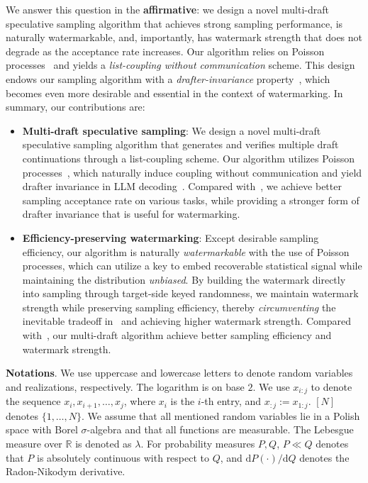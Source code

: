 \documentclass{article}
\theoremstyle{plain}
\theoremstyle{definition}
\begin{document}
We answer this question in the \textbf{affirmative}: we design a novel multi-draft speculative sampling algorithm that achieves strong sampling performance, is naturally watermarkable, and, importantly, has watermark strength that does not degrade as the acceptance rate increases. 
Our algorithm relies on Poisson processes~\citep{li2021unified, maddison2016poisson} and yields a \emph{list-coupling without communication} scheme. This design %
endows our sampling algorithm with a \emph{drafter-invariance} property~\citep{daliri2025coupling, rowan2025list}, which becomes even more desirable and essential in the context of watermarking. 
In summary, our contributions are: 
\begin{itemize}
    \item \textbf{Multi-draft speculative sampling}: We design a novel multi-draft speculative sampling algorithm that generates and verifies multiple draft continuations through a list-coupling scheme. 
    Our algorithm utilizes Poisson processes~\citep{li2021unified,maddison2016poisson}, which naturally induce coupling without communication and yield drafter invariance in LLM decoding~\citep{daliri2025coupling,rowan2025list}. 
    Compared with~\citep{rowan2025list}, we achieve better sampling acceptance rate on various tasks, while providing a stronger form of drafter invariance that is useful for watermarking. 
        
    \item \textbf{Efficiency-preserving watermarking}: Except desirable sampling efficiency, our algorithm is naturally \emph{watermarkable} with %
    the use of Poisson processes, which can utilize %
    a key to embed recoverable statistical signal while maintaining the distribution \emph{unbiased}. 
    By building the watermark directly into sampling through target-side keyed randomness, we maintain watermark strength while preserving sampling efficiency, thereby \emph{circumventing} the inevitable tradeoff in~\citep{hu2024inevitable} and achieving higher watermark strength.
    Compared with~\citep{hu2024inevitable, he2026improving}, our multi-draft  algorithm achieve better sampling efficiency and watermark strength. 
\end{itemize}

\textbf{Notations}. 
We use uppercase and lowercase letters to denote random variables and realizations, respectively. 
The logarithm is on base $2$. 
We use $x_{i:j}$ to denote the sequence $x_i, x_{i + 1}, \ldots, x_j$, where $x_i$ is the $i$-th entry, and $x_{:j} := x_{1:j}$. 
$[N]$ denotes $\{1,\ldots,N\}$. 
We assume that all mentioned random variables lie in a Polish space with Borel $\sigma$-algebra and that all functions are measurable. 
The Lebesgue measure over $\mathbb{R}$ is denoted as $\lambda$. 
For probability measures $P, Q$, $P\ll Q$ denotes that $P$ is absolutely continuous with respect to $Q$, and $\mathrm{d}P(\cdot)/ \mathrm{d}Q$ denotes the Radon-Nikodym derivative. 
\end{document}
